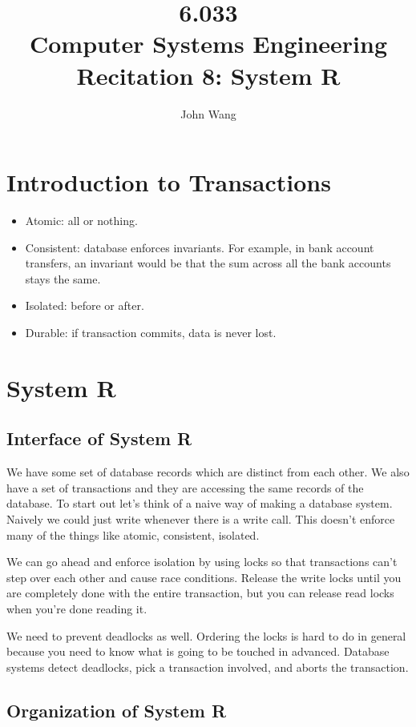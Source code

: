 \documentclass[psamsfonts]{amsart}
\title{6.033 \\
Computer Systems Engineering \\
Recitation 8: System R}
\author{John Wang}
\begin{document}
\maketitle

\section{Introduction to Transactions}

\begin{itemize}
  \item Atomic: all or nothing.
  \item Consistent: database enforces invariants. For example, in bank account transfers, an invariant would be that the sum across all the bank accounts stays the same.
  \item Isolated: before or after.
  \item Durable: if transaction commits, data is never lost.
\end{itemize}

\section{System R}

\subsection{Interface of System R}

We have some set of database records which are distinct from each other. We also have a set of transactions and they are accessing the same records of the database. To start out let's think of a naive way of making a database system. Naively we could just write whenever there is a write call. This doesn't enforce many of the things like atomic, consistent, isolated.

We can go ahead and enforce isolation by using locks so that transactions can't step over each other and cause race conditions. Release the write locks until you are completely done with the entire transaction, but you can release read locks when you're done reading it.

We need to prevent deadlocks as well. Ordering the locks is hard to do in general because you need to know what is going to be touched in advanced. Database systems detect deadlocks, pick a transaction involved, and aborts the transaction.

\subsection{Organization of System R}
\end{document}
